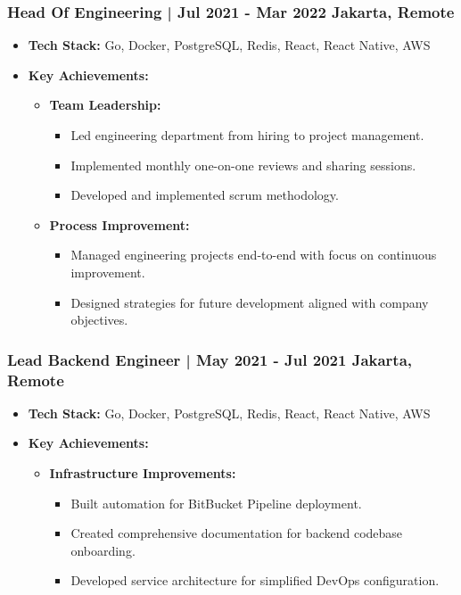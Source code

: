 \documentclass[11pt]{article}
\begin{document}
\subsubsection{Head Of Engineering | Jul 2021 - Mar 2022 \hfill Jakarta, Remote}
\begin{itemize}
    \item \textbf{Tech Stack:} Go, Docker, PostgreSQL, Redis, React, React Native, AWS
    \item \textbf{Key Achievements:}
    \begin{itemize}
        \item \textbf{Team Leadership:}
        \begin{itemize}
            \item Led engineering department from hiring to project management.
            \item Implemented monthly one-on-one reviews and sharing sessions.
            \item Developed and implemented scrum methodology.
        \end{itemize}
        \item \textbf{Process Improvement:}
        \begin{itemize}
            \item Managed engineering projects end-to-end with focus on continuous improvement.
            \item Designed strategies for future development aligned with company objectives.
        \end{itemize}
    \end{itemize}
\end{itemize}

\subsubsection{Lead Backend Engineer | May 2021 - Jul 2021 \hfill Jakarta, Remote}
\begin{itemize}
    \item \textbf{Tech Stack:} Go, Docker, PostgreSQL, Redis, React, React Native, AWS
    \item \textbf{Key Achievements:}
    \begin{itemize}
        \item \textbf{Infrastructure Improvements:}
        \begin{itemize}
            \item Built automation for BitBucket Pipeline deployment.
            \item Created comprehensive documentation for backend codebase onboarding.
            \item Developed service architecture for simplified DevOps configuration.
        \end{itemize}
    \end{itemize}
\end{itemize}
\end{document}
